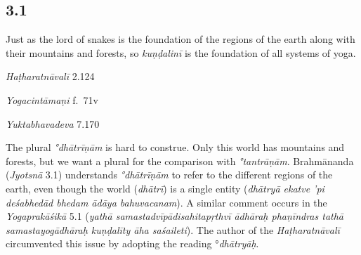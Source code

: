 

\pagestyle{HPed}
\begin{ekdosis}

\subsection*{3.1}
\begin{translation}[hp03_001]
Just as the lord of snakes is the foundation of the regions of the earth along with their mountains and forests, so \emph{kuṇḍalinī} is the foundation of all systems of yoga.
\end{translation}


\begin{testimonia}[hp03_001]
\emph{Haṭharatnāvalī} 2.124
\begin{versinnote}
\end{versinnote}

\emph{Yogacintāmaṇi} f.~71v
\begin{versinnote}
\end{versinnote}

\emph{Yuktabhavadeva} 7.170
\begin{versinnote}
\end{versinnote}
\end{testimonia}

\begin{philcomm}[hp03_001]
The plural \emph{°dhātrīṇām} is hard to construe. Only this world has mountains and forests, but we want a plural for the comparison with \emph{°tantrāṇām}. Brahmānanda (\emph{Jyotsnā} 3.1) understands \emph{°dhātrīṇām} to refer to the different regions of the earth, even though the world (\emph{dhātrī}) is a single entity (\emph{dhātryā ekatve 'pi deśabhedād bhedam ādāya bahuvacanam}). A similar comment occurs in the \emph{Yogaprakāśikā} 5.1 (\emph{yathā samastadvīpādisahitapṛthvī ādhāraḥ phaṇīndras tathā samastayogādhāraḥ kuṇḍalīty āha saśaileti}). The author of the \textit{Haṭharatnāvalī} circumvented this issue by adopting the reading °\textit{dhātryāḥ}.
\end{philcomm}


\end{ekdosis}
